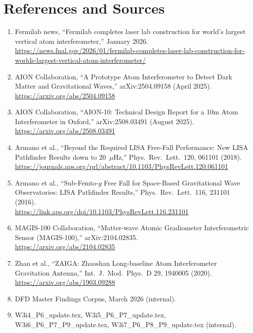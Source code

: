 \documentclass[11pt]{article}
\theoremstyle{definition}
\theoremstyle{remark}
\begin{document}

\section*{References and Sources}

\begin{enumerate}[nosep]
\item Fermilab news, ``Fermilab completes laser lab construction for world's
  largest vertical atom interferometer,'' January 2026.\\
  \url{https://news.fnal.gov/2026/01/fermilab-completes-laser-lab-construction-for-worlds-largest-vertical-atom-interferometer/}

\item AION Collaboration, ``A Prototype Atom Interferometer to Detect Dark
  Matter and Gravitational Waves,'' arXiv:2504.09158 (April 2025).\\
  \url{https://arxiv.org/abs/2504.09158}

\item AION Collaboration, ``AION-10: Technical Design Report for a 10m Atom
  Interferometer in Oxford,'' arXiv:2508.03491 (August 2025).\\
  \url{https://arxiv.org/abs/2508.03491}

\item Armano et al., ``Beyond the Required LISA Free-Fall Performance: New
  LISA Pathfinder Results down to 20~$\mu$Hz,'' Phys.\ Rev.\ Lett.\ 120,
  061101 (2018).\\
  \url{https://journals.aps.org/prl/abstract/10.1103/PhysRevLett.120.061101}

\item Armano et al., ``Sub-Femto-$g$ Free Fall for Space-Based Gravitational
  Wave Observatories: LISA Pathfinder Results,'' Phys.\ Rev.\ Lett.\ 116,
  231101 (2016).\\
  \url{https://link.aps.org/doi/10.1103/PhysRevLett.116.231101}

\item MAGIS-100 Collaboration, ``Matter-wave Atomic Gradiometer Interferometric
  Sensor (MAGIS-100),'' arXiv:2104.02835.\\
  \url{https://arxiv.org/abs/2104.02835}

\item Zhan et al., ``ZAIGA: Zhaoshan Long-baseline Atom Interferometer
  Gravitation Antenna,'' Int.\ J.\ Mod.\ Phys.\ D 29, 1940005 (2020).\\
  \url{https://arxiv.org/abs/1903.09288}

\item DFD Master Findings Corpus, March 2026 (internal).

\item W3i4\_P6\_update.tex, W3i5\_P6\_P7\_update.tex,
  W3i6\_P6\_P7\_P9\_update.tex, W3i7\_P6\_P8\_P9\_update.tex (internal).
\end{enumerate}
\end{document}
